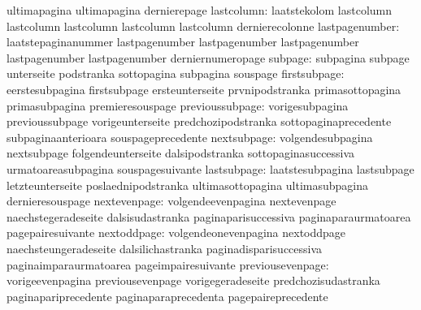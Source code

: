                            ultimapagina              ultimapagina
                           dernierepage
               lastcolumn: laatstekolom              lastcolumn
                           lastcolumn                lastcolumn
                           lastcolumn                lastcolumn
                           dernierecolonne
           lastpagenumber: laatstepaginanummer       lastpagenumber
                           lastpagenumber            lastpagenumber
                           lastpagenumber            lastpagenumber
                           derniernumeropage
                  subpage: subpagina                 subpage
                           unterseite                podstranka
                           sottopagina               subpagina
                           souspage
             firstsubpage: eerstesubpagina           firstsubpage
                           ersteunterseite           prvnipodstranka
                           primasottopagina          primasubpagina
                           premieresouspage
          previoussubpage: vorigesubpagina           previoussubpage
                           vorigeunterseite          predchozipodstranka
                           sottopaginaprecedente     subpaginaanterioara
                           souspageprecedente
              nextsubpage: volgendesubpagina         nextsubpage
                           folgendeunterseite        dalsipodstranka
                           sottopaginasuccessiva     urmatoareasubpagina
                           souspagesuivante
              lastsubpage: laatstesubpagina          lastsubpage
                           letzteunterseite          poslaednipodstranka
                           ultimasottopagina         ultimasubpagina
                           dernieresouspage
             nextevenpage: volgendeevenpagina        nextevenpage
                           naechstegeradeseite       dalsisudastranka
                           paginaparisuccessiva      paginaparaurmatoarea
                           pagepairesuivante
              nextoddpage: volgendeonevenpagina      nextoddpage
                           naechsteungeradeseite     dalsilichastranka
                           paginadisparisuccessiva   paginaimparaurmatoarea
                           pageimpairesuivante
         previousevenpage: vorigeevenpagina          previousevenpage
                           vorigegeradeseite         predchozisudastranka
                           paginapariprecedente      paginaparaprecedenta
                           pagepaireprecedente
